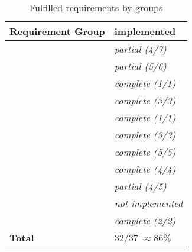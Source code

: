 \begin{table}[H]
    \begin{tabu}{X l}
        \toprule
        Requirement Group
        & implemented\\
        \midrule

        & \textit{partial (4/7)} \\

        & \textit{partial (5/6)}\\

        & \textit{complete (1/1)}\\

        & \textit{complete (3/3)}\\

        & \textit{complete (1/1)}\\

        & \textit{complete (3/3)}\\

        & \textit{complete (5/5)}\\

        & \textit{complete (4/4)}\\

        & \textit{partial (4/5)}\\

        & \textit{not implemented}\\

        & \textit{complete (2/2)}\\

        \textbf{Total}
        & 32/37 $\approx 86\%$ \\

    \end{tabu}
    \caption{Fulfilled requirements by groups}
    \label{tab:implemented-requirements}
\end{table}


